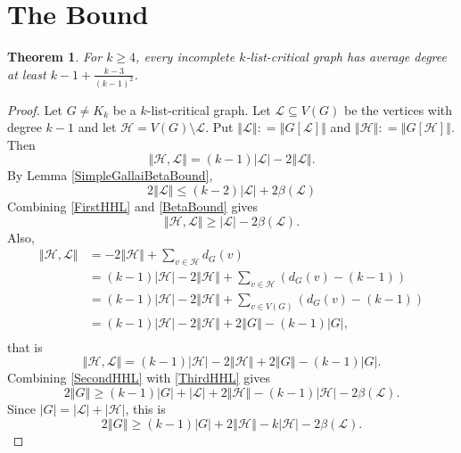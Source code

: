 \documentclass[12pt]{article}
\theoremstyle{plain}
\newtheorem{thm}{Theorem}[section]
\theoremstyle{definition}
\theoremstyle{remark}
\newcommand{\fancy}[1]{\mathcal{#1}}
\renewcommand{\L}{\fancy{L}}
\newcommand{\HH}{\fancy{H}}
\newcommand{\card}[1]{\left|#1\right|}
\newcommand{\size}[1]{\left\Vert#1\right\Vert}
\newcommand{\parens}[1]{\left( #1 \right)}
\newcommand{\DefinedAs}{\mathrel{\mathop:}=}
\begin{document}
\section{The Bound}
\begin{thm}
	For $k \ge 4$, every incomplete $k$-list-critical graph has average degree at least $k-1 + \frac{k-3}{(k-1)^2}$.
\end{thm}
\begin{proof}
	Let $G \ne K_k$ be a $k$-list-critical graph.  Let $\L \subseteq V(G)$ be the vertices with degree $k-1$ and let $\HH = V(G) \setminus \L$.  Put $\size{\L} \DefinedAs \size{G[\L]}$ and $\size{\HH} \DefinedAs \size{G[\HH]}$.  
	Then
	\begin{equation}
		\size{\HH, \L} = (k-1)\card{\L} - 2\size{\L}.
		\label{FirstHHL}
	\end{equation}
	By Lemma \ref{SimpleGallaiBetaBound},
		\begin{equation}
		2\size{\L} \le (k-2)|\L| + 2\beta(\L)
		\label{BetaBound}
		\end{equation}
		Combining \ref{FirstHHL} and \ref{BetaBound} gives
			\begin{equation}
			\size{\HH, \L} \ge \card{\L} - 2\beta(\L).
			\label{SecondHHL}
			\end{equation}
			Also,
			\begin{align*}
			\size{\HH, \L} &= -2\size{\HH} + \sum_{v \in \HH} d_G(v) \\
			&= (k-1)\card{\HH} - 2\size{\HH} + \sum_{v \in \HH} \parens{d_G(v) - (k-1)} \\
			&= (k-1)\card{\HH} - 2\size{\HH} + \sum_{v \in V(G)} \parens{d_G(v) - (k-1)}\\
			&=(k-1)\card{\HH} - 2\size{\HH} + 2\size{G} - (k-1)\card{G},\\
			\end{align*}
			that is
			\begin{equation}
			\size{\HH, \L} = (k-1)\card{\HH} - 2\size{\HH} + 2\size{G} - (k-1)\card{G}.
			\label{ThirdHHL}
			\end{equation}
			Combining \ref{SecondHHL} with \ref{ThirdHHL} gives
			\begin{equation*}
			  2\size{G} \ge (k-1)\card{G} + \card{\L} + 2\size{\HH} - (k-1)\card{\HH} - 2\beta(\L).
			\end{equation*}
			Since $\card{G} = \card{\L} + \card{\HH}$, this is
			\begin{equation}
			2\size{G} \ge (k-1)\card{G} + 2\size{\HH} - k\card{\HH} - 2\beta(\L).
			\label{FirstTwoG}
			\end{equation}

\end{proof}
\end{document}
